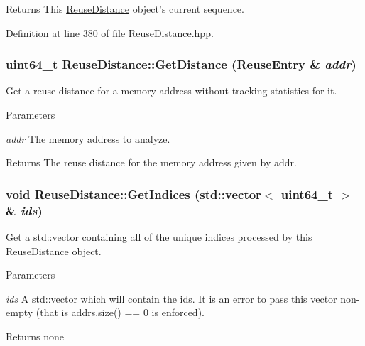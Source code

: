 \begin{DoxyReturn}{Returns}
This \hyperlink{class_reuse_distance}{ReuseDistance} object's current sequence. 
\end{DoxyReturn}


Definition at line 380 of file ReuseDistance.hpp.

\hypertarget{class_reuse_distance_ac70a23e9dc4b242f11d76e257e894bef}{
\subsubsection[{GetDistance}]{\setlength{\rightskip}{0pt plus 5cm}uint64\_\-t ReuseDistance::GetDistance ({\bf ReuseEntry} \& {\em addr})}}
\label{class_reuse_distance_ac70a23e9dc4b242f11d76e257e894bef}
Get a reuse distance for a memory address without tracking statistics for it.


\begin{DoxyParams}{Parameters}
\item[{\em addr}]The memory address to analyze.\end{DoxyParams}
\begin{DoxyReturn}{Returns}
The reuse distance for the memory address given by addr. 
\end{DoxyReturn}
\hypertarget{class_reuse_distance_a99fb4b3aae663676515ad354691b7cc6}{
\subsubsection[{GetIndices}]{\setlength{\rightskip}{0pt plus 5cm}void ReuseDistance::GetIndices (std::vector$<$ uint64\_\-t $>$ \& {\em ids})}}
\label{class_reuse_distance_a99fb4b3aae663676515ad354691b7cc6}
Get a std::vector containing all of the unique indices processed by this \hyperlink{class_reuse_distance}{ReuseDistance} object.


\begin{DoxyParams}{Parameters}
\item[{\em ids}]A std::vector which will contain the ids. It is an error to pass this vector non-\/empty (that is addrs.size() == 0 is enforced).\end{DoxyParams}
\begin{DoxyReturn}{Returns}
none 
\end{DoxyReturn}


